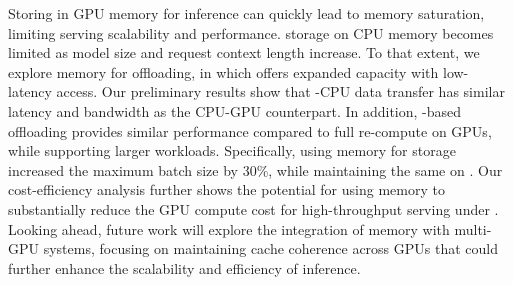 Storing \kvcache in GPU memory for \llm inference can quickly lead to memory saturation, limiting serving scalability and performance.
\kvcache storage on CPU memory becomes limited as model size and request context length increase.
To that extent, we explore \cxl memory for \kvcache offloading, in which \cxl offers expanded capacity with low-latency access.
Our preliminary results show that \cxl-CPU data transfer has similar latency and bandwidth as the CPU-GPU counterpart.
In addition, \cxl-based \kvcache offloading provides similar performance compared to full \kv re-compute on GPUs, while supporting larger workloads. 
Specifically, using \cxl memory for \kvcache storage increased the maximum batch size by 30\%, while maintaining the same \slo on \ttft. 
Our cost-efficiency analysis further shows the potential for using \cxl memory to substantially reduce the GPU compute cost for high-throughput \llm serving under \slo.
Looking ahead, future work will explore the integration of \cxl memory with multi-GPU systems, focusing on maintaining cache coherence across GPUs that could further enhance the scalability and efficiency of \llm inference.